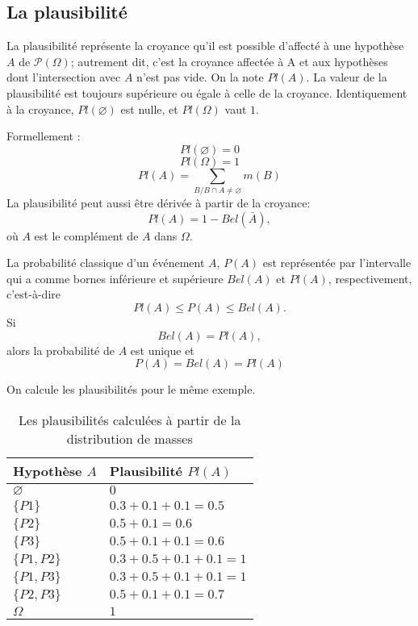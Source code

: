 \subsection{La plausibilité}

La plausibilité représente la croyance qu’il est possible
d’affecté à une hypothèse $A$ de $\mathcal{P}(\Omega)$; autrement dit,
c’est la croyance affectée à A et aux hypothèses dont l'intersection
avec $A$ n’est pas vide. On la note $Pl(A)$. La valeur de la plausibilité est
toujours supérieure ou égale à celle de la croyance. Identiquement à la
croyance, $Pl(\varnothing)$ est nulle, et $Pl(\Omega)$ vaut $1$.

Formellement :
\begin{equation}
Pl(\varnothing) = 0
\end{equation}
\begin{equation}
Pl(\Omega) = 1
\end{equation}
\begin{equation}
Pl(A) = \sum_{B \slash B \cap A \neq \varnothing} m(B)
\end{equation}
La plausibilité peut aussi être dérivée à partir de la croyance:
\begin{equation}
Pl(A) = 1 - Bel(\bar{A}),
\end{equation}
où $A$ est le complément de $A$ dans $\Omega$.

La probabilité classique d’un événement $A$, $P(A)$ est représentée par
l’intervalle qui a comme bornes inférieure et supérieure $Bel(A)$ et $Pl(A)$,
respectivement, c’est-à-dire $$Pl(A) \leq P(A) \leq Bel(A).$$
Si $$Bel(A) = Pl(A),$$ alors la probabilité de $A$ est unique et $$P(A) = Bel(A) = Pl(A)$$

\begin{exemple}
On calcule les plausibilités pour le même exemple.

\begin{table}[H]
\centering
\begin{tabular}{|l|l|}
\hline
Hypothèse $A$ & Plausibilité $Pl(A)$\\
\hline
$\varnothing$ & $0$ \\
\hline
$\{P1\}$ & $0.3 + 0.1 + 0.1 = 0.5$ \\
\hline
$\{P2\}$ & $0.5 + 0.1 = 0.6$ \\
\hline
$\{P3\}$ & $0.5 + 0.1 + 0.1 = 0.6$ \\
\hline
$\{P1, P2\}$ & $0.3 + 0.5 + 0.1 + 0.1 = 1$ \\
\hline
$\{P1, P3\}$ & $0.3 + 0.5 + 0.1 + 0.1 = 1$ \\
\hline
$\{P2, P3\}$ & $0.5 + 0.1 + 0.1 = 0.7$ \\
\hline
$\Omega$ & $1$ \\
\hline
\end{tabular}
\caption{Les plausibilités calculées à partir de la distribution de masses}
\end{table}
\end{exemple}
